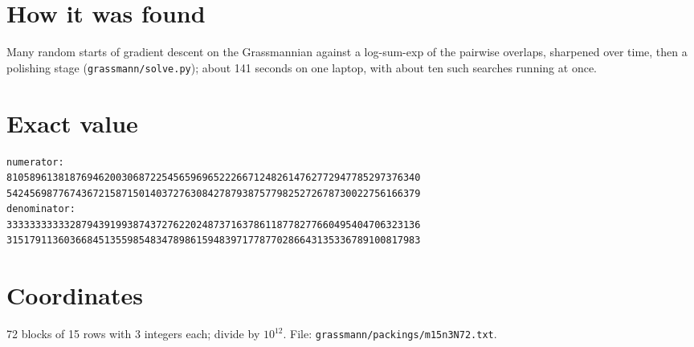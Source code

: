 \documentclass[11pt,a4paper]{article}
\begin{document}
\section{How it was found}
Many random starts of gradient descent on the Grassmannian against a log-sum-exp of the pairwise overlaps, sharpened over time, then a polishing stage (\texttt{grassmann/solve.py}); about 141 seconds on one laptop, with about ten such searches running at once.


\appendix
\section{Exact value}
{\small
\begin{verbatim}
numerator:
810589613818769462003068722545659696522266712482614762772947785297376340
542456987767436721587150140372763084278793875779825272678730022756166379
denominator:
333333333332879439199387437276220248737163786118778277660495404706323136
315179113603668451355985483478986159483971778770286643135336789100817983
\end{verbatim}}

\section{Coordinates}
72 blocks of 15 rows with 3 integers each; divide by $10^{12}$. File: \texttt{grassmann/packings/m15n3N72.txt}.
{\tiny
\begin{multicols}{3}
\end{multicols}}
\end{document}
